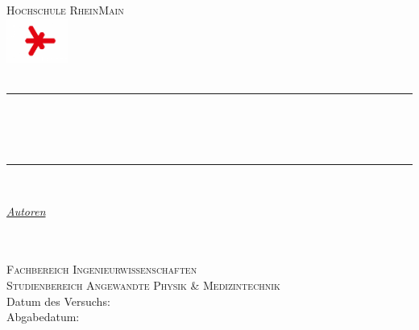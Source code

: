\begin{titlepage} 
	\newcommand{\HRule}{\rule{\linewidth}{0.5mm}} 	
	\centering
	\textsc{\Large Hochschule RheinMain \\
		\includegraphics[width=0.15\textwidth]{logo-hsrm}\\[1cm]}
	\textsc{\LARGE \titelLV}\\[0.5cm]
		\HRule\\[0.4cm]
	{\huge\bfseries \untertitela}\\[0.4cm] %
	{\huge\bfseries \untertitelb}\\[0.4cm] %
		\HRule\\[1.5cm]
	\begin{minipage}{0.4\textwidth}
		\large
		\textit{\underline{Autoren}}\\[0.5cm]
		\textsc{\nameA}\\[0.5cm]
		\textsc{\nameB}\\[0.5cm]
\end{minipage}
\vfill\vfill\vfill 
\textsc{\Large Fachbereich Ingenieurwissenschaften}\\[0.5cm]
\textsc{\large Studienbereich Angewandte Physik \& Medizintechnik}\\[0.5cm] 
\vfill	
Datum des Versuchs:\hspace{0.4cm} {\large\datumLV}\\
Abgabedatum:\hspace{0.4cm} {\large\deadline} 
\end{titlepage}

